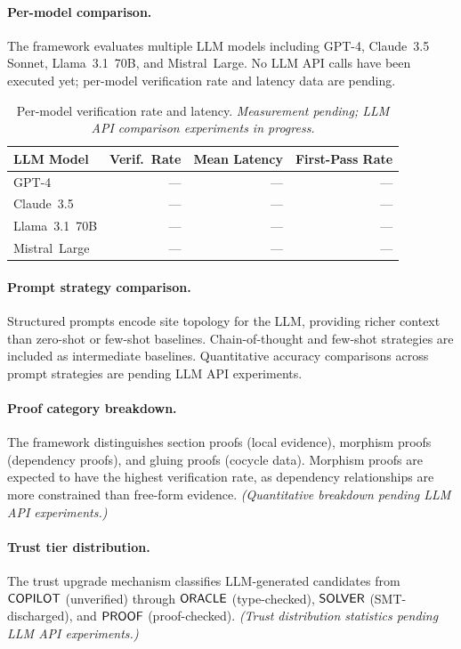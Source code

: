 \documentclass[11pt]{article}
\begin{document}
\paragraph{Per-model comparison.}
The framework evaluates multiple LLM models including GPT-4, Claude~3.5 Sonnet,
Llama~3.1~70B, and Mistral~Large.  No LLM API calls have been executed yet;
per-model verification rate and latency data are pending.

\begin{table}[H]
\centering
\caption{Per-model verification rate and latency.
  \emph{Measurement pending; LLM API comparison experiments in progress.}}
\label{tab:model-comparison}
\begin{tabular}{lrrr}
\toprule
\textbf{LLM Model} & \textbf{Verif.\ Rate}
  & \textbf{Mean Latency} & \textbf{First-Pass Rate} \\
\midrule
GPT-4          & --- & --- & --- \\
Claude~3.5     & --- & --- & --- \\
Llama~3.1~70B  & --- & --- & --- \\
Mistral~Large  & --- & --- & --- \\
\bottomrule
\end{tabular}
\end{table}

\paragraph{Prompt strategy comparison.}
Structured prompts encode site topology for the LLM, providing richer context
than zero-shot or few-shot baselines.  Chain-of-thought and few-shot strategies
are included as intermediate baselines.  Quantitative accuracy comparisons
across prompt strategies are pending LLM API experiments.

\paragraph{Proof category breakdown.}
The framework distinguishes section proofs (local evidence),
morphism proofs (dependency proofs), and gluing proofs (cocycle data).
Morphism proofs are expected to have the highest verification rate,
as dependency relationships are more constrained than free-form evidence.
\emph{(Quantitative breakdown pending LLM API experiments.)}

\paragraph{Trust tier distribution.}
The trust upgrade mechanism classifies LLM-generated candidates from
$\mathsf{COPILOT}$ (unverified) through $\mathsf{ORACLE}$ (type-checked), $\mathsf{SOLVER}$
(SMT-discharged), and $\mathsf{PROOF}$ (proof-checked).
\emph{(Trust distribution statistics pending LLM API experiments.)}
\end{document}
